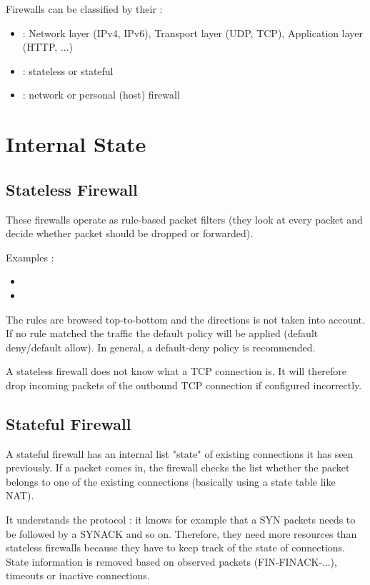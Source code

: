 Firewalls can be classified by their :
\begin{itemize}
    \item {} : Network layer (IPv4, IPv6), Transport layer (UDP, TCP), Application layer (HTTP, ...)
    \item {} : stateless or stateful
    \item {} : network or personal (host) firewall
\end{itemize}

\section{Internal State}

\subsection{Stateless Firewall}

These firewalls operate as rule-based packet filters (they look at every packet and decide whether packet should be dropped or forwarded).

Examples :
\begin{itemize}
    \item {}
    \item {}
\end{itemize}

The rules are browsed top-to-bottom and the directions is not taken into account. If no rule matched the traffic the default policy will be applied (default deny/default allow). In general, a default-deny policy is recommended.

A stateless firewall does not know what a TCP connection is. It will therefore drop incoming packets of the outbound TCP connection if configured incorrectly.

\subsection{Stateful Firewall}

A stateful firewall has an internal list "state" of existing connections it has seen previously. If a packet comes in, the firewall checks the list whether the packet belongs to one of the existing connections (basically using a state table like NAT).

It understands the protocol : it knows for example that a SYN packets needs to be followed by a SYNACK and so on. Therefore, they need more resources than stateless firewalls because they have to keep track of the state of connections. State information is removed based on observed packets (FIN-FINACK-...), timeouts or inactive connections.


